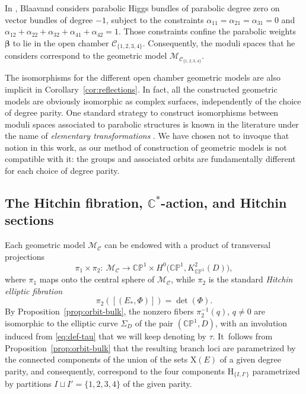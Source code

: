 \documentclass[pdftex]{sigma}
\newcommand{\field}[1]{\ensuremath{\mathbb{#1}}}
\newcommand{\CC}{\field{C}}
\newcommand{\PP}{\field{P}}
\newcommand{\curly}[1]{\mathscr{#1}}
\newcommand{\cM}{\curly{M}}
\newcommand{\qC}{\mathcal{C}}
\numberwithin{equation}{section}
\begin{document}
\begin{Remark}\label{rem:Blaavand}
In \cite[Section 6.7]{Bla15}, Blaavand considers parabolic Higgs bundles of parabolic degree zero on vector bundles of degree $-1$, subject to the constraints $\alpha_{11} = \alpha_{21} = \alpha_{31} = 0$ and $\alpha_{12}+\alpha_{22}+\alpha_{32}+\alpha_{41}+\alpha_{42} =1$. Those constraints confine the parabolic weights $\pmb{\beta}$ to lie in the open chamber $\qC_{\{1,2,3,4\}}$. Consequently, the moduli spaces that he considers correspond to the geometric model $\cM_{\qC_{\{1,2,3,4\}}}$.
\end{Remark}

\begin{Remark}
The isomorphisms for the different open chamber geometric models are also implicit in Corollary~\ref{cor:reflections}.
In fact, all the constructed geometric models are obviously isomorphic as complex surfaces, independently of the choice of degree parity. One standard strategy to construct isomorphisms between moduli spaces associated to parabolic structures is known in the literature under the name of \textit{elementary transformations} \cite{LS15,LSS13}. We have chosen not to invoque that notion in this work, as our method of construction of geometric models is not compatible with it: the groups and associated orbits are fundamentally different for each choice of degree parity.
\end{Remark}














\subsection[The Hitchin fibration, \protect{$C\textasciicircum{}{*}$}-action, and Hitchin sections]
{The Hitchin fibration, $\boldsymbol{\CC^{*}}$-action, and Hitchin sections}


Each geometric model $\cM_{\qC}$ can be endowed with a product of transversal projections
\[
\pi_{1}\times \pi_{2}\colon\ \cM_{\qC}\rightarrow \CC\PP^{1}\times H^{0}\bigl(\CC\PP^{1},K^{2}_{\CC\PP^{1}}(D)\bigr),
\]
where $\pi_{1}$ maps onto the central sphere of $\cM_{\qC}$, while $\pi_{2}$ is the standard \textit{Hitchin elliptic fibration}
\[
 \pi_{2}([(E_{*},\Phi)]) = \det(\Phi).
\]
By Proposition~\ref{prop:orbit-bulk}, the nonzero fibers $\pi_{2}^{-1}(q)$, $q\neq 0$ are isomorphic to the elliptic curve $\Sigma_{D}$ of the pair $(\CC\PP^{1},D)$, with an involution induced from \eqref{eq:def-tau} that we will keep denoting by $\tau$. It~follows from Proposition~\ref{prop:orbit-bulk} that the resulting branch loci are parametrized by the connected components of the union of the sets $\mathrm{X}(E)$ of a given degree parity, and consequently, correspond to the four components $\mathrm{H}_{\{I,I'\}}$ parametrized by partitions $I\sqcup I' = \{1,2,3,4\}$ of the given parity.
\end{document}
